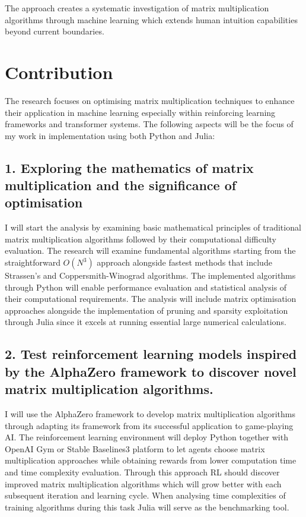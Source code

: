 \documentclass{article}
\begin{document}
The approach creates a systematic investigation of matrix multiplication algorithms through machine learning which extends human intuition capabilities beyond current boundaries.

\section{Contribution}
The research focuses on optimising matrix multiplication techniques to enhance their application in machine learning especially within reinforcing learning frameworks and transformer systems. The following aspects will be the focus of my work in implementation using both Python and Julia:

\subsection*{1. Exploring the mathematics of matrix multiplication and the significance of optimisation}
I will start the analysis by examining basic mathematical principles of traditional matrix multiplication algorithms followed by their computational difficulty evaluation. The research will examine fundamental algorithms starting from the straightforward \( O(N^3) \) approach alongside fastest methods that include Strassen's and Coppersmith-Winograd algorithms. The implemented algorithms through Python will enable performance evaluation and statistical analysis of their computational requirements. The analysis will include matrix optimisation approaches alongside the implementation of pruning and sparsity exploitation through Julia since it excels at running essential large numerical calculations.

\subsection*{2. Test reinforcement learning models inspired by the AlphaZero framework to discover novel matrix multiplication algorithms.}
I will use the AlphaZero framework to develop matrix multiplication algorithms through adapting its framework from its successful application to game-playing AI. The reinforcement learning environment will deploy Python together with OpenAI Gym or Stable Baselines3 platform to let agents choose matrix multiplication approaches while obtaining rewards from lower computation time and time complexity evaluation. Through this approach RL should discover improved matrix multiplication algorithms which will grow better with each subsequent iteration and learning cycle. When analysing time complexities of training algorithms during this task Julia will serve as the benchmarking tool.
\end{document}
